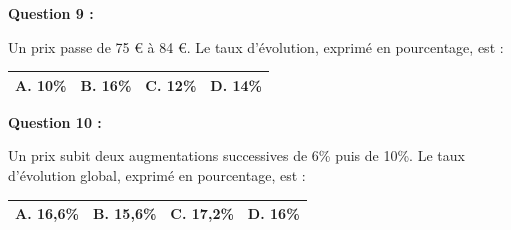 \documentclass[12pt,a4paper]{article}
\begin{document}
\vspace{0.7cm}

\textbf{Question 9 :}
\vspace{5pt}

Un prix passe de 75 € à 84 €. Le taux d’évolution, exprimé en pourcentage, est :
\vspace{0.3cm}

\renewcommand{\arraystretch}{3}
\begin{tabular}{|m{3.4cm}|m{3.4cm}|m{3.4cm}|m{3.4cm}|}
\hline
\centering \vspace{-0.3cm} \textbf{A.} 10\% & 
\centering \vspace{-0.3cm} \textbf{B.} 16\% & 
\centering \vspace{-0.3cm} \textbf{C.} 12\% & 
\centering \vspace{-0.3cm} \textbf{D.} 14\% \tabularnewline
\hline
\end{tabular}

\vspace{0.7cm}

\textbf{Question 10 :}
\vspace{5pt}

Un prix subit deux augmentations successives de 6\% puis de 10\%. Le taux d’évolution global, exprimé en pourcentage, est :
\vspace{0.3cm}

\renewcommand{\arraystretch}{3}
\begin{tabular}{|m{3.4cm}|m{3.4cm}|m{3.4cm}|m{3.4cm}|}
\hline
\centering \vspace{-0.3cm} \textbf{A.} 16,6\% & 
\centering \vspace{-0.3cm} \textbf{B.} 15,6\% & 
\centering \vspace{-0.3cm} \textbf{C.} 17,2\% & 
\centering \vspace{-0.3cm} \textbf{D.} 16\% \tabularnewline
\hline
\end{tabular}
\end{document}
